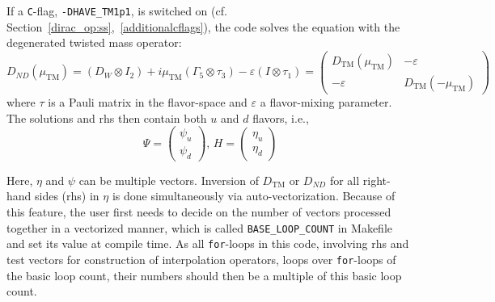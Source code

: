 \documentclass[a4paper,12pt]{scrartcl}
\begin{document}
If a \texttt{C}-flag, \texttt{-DHAVE\_TM1p1}, is switched on (cf. Section~\ref{dirac_op:ss},~\ref{additionalcflags}), the code solves the equation with the degenerated twisted mass operator: 
\begin{equation*}
D_{ND}(\mu_\mathrm{TM}) = (D_{W}\otimes I_2) + i\mu_\mathrm{TM}(\Gamma_5\otimes \tau_3) - \varepsilon(I\otimes\tau_1)
=
\begin{pmatrix}
D_{\mathrm{TM}}(\mu_\mathrm{TM}) & -\varepsilon\\
-\varepsilon & D_{\mathrm{TM}}(-\mu_\mathrm{TM})
\end{pmatrix}
\end{equation*}
where $\tau$ is a Pauli matrix in the flavor-space and $\varepsilon$ a flavor-mixing parameter.  The solutions and rhs then contain both $u$ and $d$ flavors, i.e., 
\begin{equation*}
\Psi = \begin{pmatrix}
\psi_u\\
\psi_d
\end{pmatrix},\,
H = \begin{pmatrix}
\eta_u\\
\eta_d
\end{pmatrix}
\end{equation*}

Here, $\eta$ and $\psi$ can be multiple vectors.  Inversion of $D_\mathrm{TM}$ or $D_{ND}$ for all right-hand sides (rhs) in $\eta$ is done simultaneously via auto-vectorization.  Because of this feature, the user first needs to decide on the number of vectors processed together in a vectorized manner, which is called \texttt{BASE\_LOOP\_COUNT} in Makefile and set its value at compile time.  As all \texttt{for}-loops in this code, involving rhs and test vectors for construction of interpolation operators, loops over \texttt{for}-loops of the basic loop count, their numbers should then be a multiple of this basic loop count.  
\end{document}
